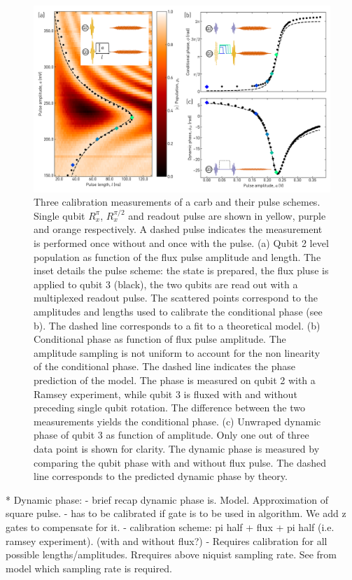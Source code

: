 \begin{figure}
    \centering
    \includegraphics[width=\textwidth]{chapters/carb_gate/figs/ch4_calibration.png}
    \caption{Three calibration measurements of a \gls{carb} and their pulse schemes. Single qubit $R_x^\pi$, $R_x^{\pi/2}$ and readout pulse are shown in yellow, purple and orange respectively. A dashed pulse indicates the measurement is performed once without and once with the pulse. (a) Qubit 2 \e level population as function of the flux pulse amplitude and length. The inset details the pulse scheme: the \oo state is prepared, the flux pluse is  applied to qubit 3 (black), the two qubits are read out with a multiplexed readout pulse. The scattered points correspond to the amplitudes and lengths used to calibrate the conditional phase (see b). The dashed line corresponds to a fit to a theoretical model. (b) Conditional phase as function of flux pulse amplitude. The amplitude sampling is not uniform to account for the non linearity of the conditional phase. The dashed line indicates the phase prediction of the model. The phase is measured on qubit 2 with a Ramsey experiment, while qubit 3 is fluxed with and without preceding single qubit rotation. The difference between the two measurements yields the conditional phase. (c) Unwraped dynamic phase of qubit 3 as function of amplitude. Only one out of three data point is shown for clarity. The dynamic phase is measured by comparing the qubit phase with and without flux pulse. The dashed line corresponds to the predicted dynamic phase by theory.}
    \label{fig:ch4_calibration_carb}
\end{figure}


* Dynamic phase:
- brief recap dynamic phase is. Model. Approximation of square pulse.
- has to be calibrated if gate is to be used in algorithm. We add z gates to compensate for it. 
- calibration scheme: pi half + flux + pi half (i.e. ramsey experiment). (with and without flux?)
- Requires calibration for all possible lengths/amplitudes. Rrequires above niquist sampling rate.
See from model which sampling rate is required.

